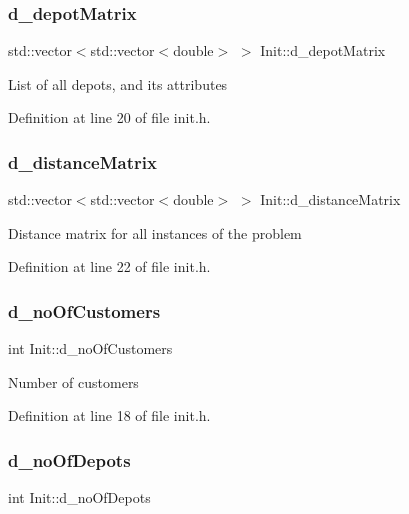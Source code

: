 \subsubsection{\texorpdfstring{d\+\_\+depot\+Matrix}{d\_depotMatrix}}
{\footnotesize\ttfamily std\+::vector$<$std\+::vector$<$double$>$ $>$ Init\+::d\+\_\+depot\+Matrix\hspace{0.3cm}{\ttfamily [private]}}

List of all depots, and its attributes 

Definition at line 20 of file init.\+h.

\mbox{\label{class_init_a602b213bdcdaecbaa1ebfb134930ad33}} 
\subsubsection{\texorpdfstring{d\+\_\+distance\+Matrix}{d\_distanceMatrix}}
{\footnotesize\ttfamily std\+::vector$<$std\+::vector$<$double$>$ $>$ Init\+::d\+\_\+distance\+Matrix\hspace{0.3cm}{\ttfamily [private]}}

Distance matrix for all instances of the problem 

Definition at line 22 of file init.\+h.

\mbox{\label{class_init_ab31f6ee0c02edc45d78d0e90a89ba45a}} 
\subsubsection{\texorpdfstring{d\+\_\+no\+Of\+Customers}{d\_noOfCustomers}}
{\footnotesize\ttfamily int Init\+::d\+\_\+no\+Of\+Customers\hspace{0.3cm}{\ttfamily [private]}}

Number of customers 

Definition at line 18 of file init.\+h.

\mbox{\label{class_init_a44d05451df796d69ecc558837ecb7105}} 
\subsubsection{\texorpdfstring{d\+\_\+no\+Of\+Depots}{d\_noOfDepots}}
{\footnotesize\ttfamily int Init\+::d\+\_\+no\+Of\+Depots\hspace{0.3cm}{\ttfamily [private]}}

